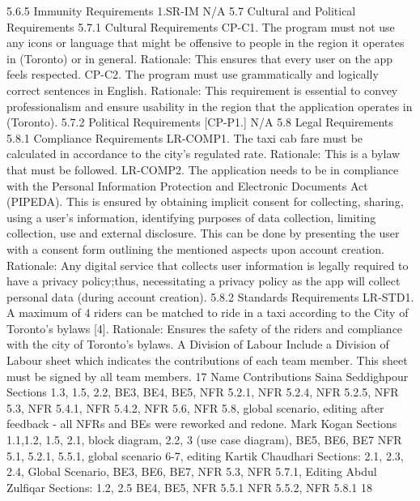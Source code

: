 5.6.5 Immunity Requirements
1.SR-IM N/A
5.7 Cultural and Political Requirements
5.7.1 Cultural Requirements
CP-C1. The program must not use any icons or language that might be offensive to people in
the region it operates in (Toronto) or in general.
Rationale: This ensures that every user on the app feels respected.
CP-C2. The program must use grammatically and logically correct sentences in English.
Rationale: This requirement is essential to convey professionalism and ensure usability in the
region that the application operates in (Toronto).
5.7.2 Political Requirements
[CP-P1.] N/A
5.8 Legal Requirements
5.8.1 Compliance Requirements
LR-COMP1. The taxi cab fare must be calculated in accordance to the city’s regulated rate.
Rationale: This is a bylaw that must be followed.
LR-COMP2. The application needs to be in compliance with the Personal Information Protection and Electronic Documents Act (PIPEDA). This is ensured by obtaining implicit consent
for collecting, sharing, using a user’s information, identifying purposes of data collection, limiting collection, use and external disclosure. This can be done by presenting the user with a
consent form outlining the mentioned aspects upon account creation.
Rationale: Any digital service that collects user information is legally required to have a privacy policy;thus, necessitating a privacy policy as the app will collect personal data (during
account creation).
5.8.2 Standards Requirements
LR-STD1. A maximum of 4 riders can be matched to ride in a taxi according to the City of
Toronto’s bylaws [4].
Rationale: Ensures the safety of the riders and compliance with the city of Toronto’s bylaws.
A Division of Labour
Include a Division of Labour sheet which indicates the contributions of each team member. This
sheet must be signed by all team members.
17
Name Contributions
Saina Seddighpour
Sections 1.3, 1.5, 2.2, BE3, BE4, BE5, NFR 5.2.1, NFR 5.2.4, NFR 5.2.5,
NFR 5.3, NFR 5.4.1, NFR 5.4.2,
NFR 5.6, NFR 5.8, global scenario, editing after feedback
- all NFRs and BEs were reworked and redone.
Mark Kogan Sections 1.1,1.2, 1.5, 2.1, block diagram, 2.2, 3 (use case diagram), BE5, BE6,
BE7 NFR 5.1, 5.2.1, 5.5.1, global scenario 6-7, editing
Kartik Chaudhari Sections: 2.1, 2.3, 2.4, Global Scenario, BE3, BE6, BE7, NFR 5.3,
NFR 5.7.1, Editing
Abdul Zulfiqar Sections: 1.2, 2.5 BE4, BE5, NFR 5.5.1 NFR 5.5.2, NFR 5.8.1
18

